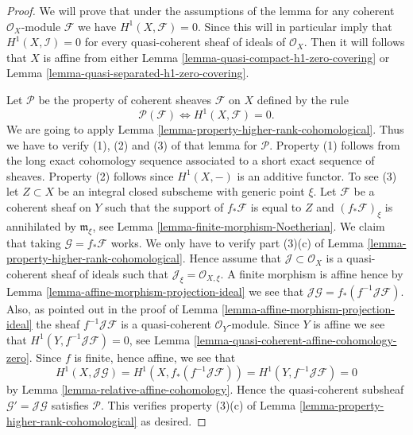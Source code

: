\begin{proof}
We will prove that under the assumptions of the lemma for any coherent
$\mathcal{O}_X$-module $\mathcal{F}$ we have $H^1(X, \mathcal{F}) = 0$.
Since this will in particular imply that $H^1(X, \mathcal{I}) = 0$
for every quasi-coherent sheaf of ideals of $\mathcal{O}_X$. Then it will
follows that $X$ is affine from either
Lemma \ref{lemma-quasi-compact-h1-zero-covering} or
Lemma \ref{lemma-quasi-separated-h1-zero-covering}.

\medskip\noindent
Let $\mathcal{P}$ be the property of coherent sheaves
$\mathcal{F}$ on $X$ defined by the rule
$$
\mathcal{P}(\mathcal{F}) \Leftrightarrow H^1(X, \mathcal{F}) = 0.
$$
We are going to apply Lemma \ref{lemma-property-higher-rank-cohomological}.
Thus we have to verify (1), (2) and (3) of that lemma for $\mathcal{P}$.
Property (1) follows from the long exact cohomology sequence associated
to a short exact sequence of sheaves. Property (2) follows since
$H^1(X, -)$ is an additive functor. To see (3) let $Z \subset X$ be
an integral closed subscheme with generic point $\xi$.
Let $\mathcal{F}$ be a coherent sheaf on $Y$ such that
the support of $f_*\mathcal{F}$ is equal to $Z$
and $(f_*\mathcal{F})_\xi$ is annihilated by $\mathfrak m_\xi$,
see Lemma \ref{lemma-finite-morphism-Noetherian}. We claim that
taking $\mathcal{G} = f_*\mathcal{F}$ works. We only have to verify
part (3)(c) of Lemma \ref{lemma-property-higher-rank-cohomological}.
Hence assume that $\mathcal{J} \subset \mathcal{O}_X$ is a
quasi-coherent sheaf of ideals such that
$\mathcal{J}_\xi = \mathcal{O}_{X, \xi}$.
A finite morphism is affine hence by
Lemma \ref{lemma-affine-morphism-projection-ideal} we see that
$\mathcal{J}\mathcal{G} = f_*(f^{-1}\mathcal{J}\mathcal{F})$.
Also, as pointed out in the proof of
Lemma \ref{lemma-affine-morphism-projection-ideal} the sheaf
$f^{-1}\mathcal{J}\mathcal{F}$ is a quasi-coherent $\mathcal{O}_Y$-module.
Since $Y$ is affine we see that $H^1(Y, f^{-1}\mathcal{J}\mathcal{F}) = 0$,
see Lemma \ref{lemma-quasi-coherent-affine-cohomology-zero}.
Since $f$ is finite, hence affine, we see that
$$
H^1(X, \mathcal{J}\mathcal{G}) =
H^1(X, f_*(f^{-1}\mathcal{J}\mathcal{F})) =
H^1(Y, f^{-1}\mathcal{J}\mathcal{F}) = 0
$$
by Lemma \ref{lemma-relative-affine-cohomology}.
Hence the quasi-coherent subsheaf $\mathcal{G}' = \mathcal{J}\mathcal{G}$
satisfies $\mathcal{P}$. This verifies property (3)(c) of
Lemma \ref{lemma-property-higher-rank-cohomological} as desired.
\end{proof}








